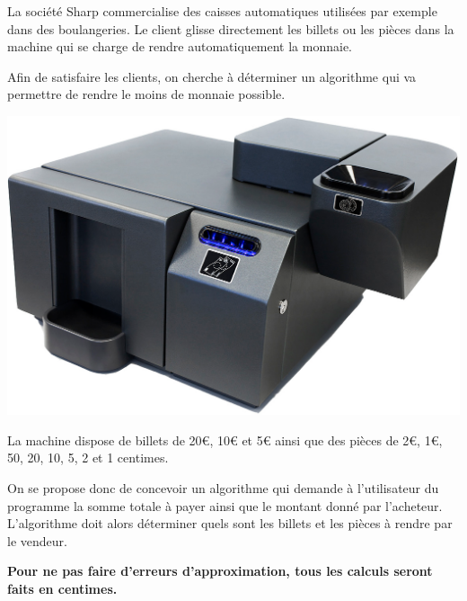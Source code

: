 \setcounter{numques}{0}

La société Sharp commercialise des caisses automatiques utilisées par exemple dans des boulangeries. Le client glisse directement les billets ou les pièces dans la machine qui se charge de rendre automatiquement la monnaie. 
\begin{obj}
Afin de satisfaire les clients, on cherche à déterminer un algorithme qui va permettre de rendre le moins de monnaie possible. 
\end{obj}

\begin{center}
\includegraphics[width=.6\linewidth]{sharp.png}
\end{center}


La machine dispose de billets de 20€, 10€ et 5€ ainsi que des pièces de 2€, 1€, 50, 20, 10, 5, 2 et 1 centimes. 

On se propose donc de concevoir un algorithme qui demande à l'utilisateur du programme la somme totale à payer ainsi que le montant donné par l'acheteur. L'algorithme doit alors déterminer quels sont les billets et les pièces à rendre par le vendeur. 

\textbf{Pour ne pas faire d'erreurs d'approximation, tous les calculs seront faits en centimes.}

